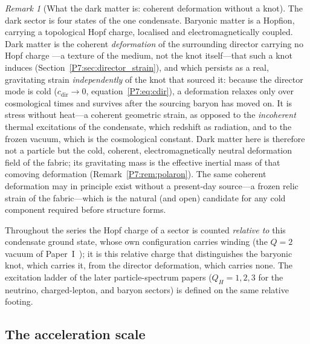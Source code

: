 \documentclass[11pt,a4paper]{article}
\theoremstyle{definition}
\theoremstyle{remark}
\newtheorem{remark}[theorem]{Remark}
\begin{document}
\begin{remark}[What the dark matter is: coherent deformation without a knot]
\label{P7:rem:cdm_ontology}
The dark sector is four states of the one condensate.  Baryonic matter
is a Hopfion, carrying a topological Hopf charge, localised and 
electromagnetically coupled.  Dark matter is the coherent
\emph{deformation} of the surrounding director carrying no Hopf charge
---a texture of the medium, not the knot itself---that such a knot induces
(Section~\ref{P7:sec:director_strain}), and which persists as a real,
gravitating strain \emph{independently} of the knot that sourced it:
because the director mode is cold ($c_{\mathrm{dir}}\to0$,
equation~\eqref{P7:eq:cdir}), a deformation relaxes only over
cosmological times and survives after the sourcing baryon has moved on.
It is stress without heat---a coherent geometric strain, as opposed to
the \emph{incoherent} thermal excitations of the condensate, which
redshift as radiation, and to the frozen vacuum, which is the
cosmological constant.  Dark matter here is therefore not a particle but
the cold, coherent, electromagnetically neutral deformation field of the
fabric; its gravitating mass is the effective inertial mass of that
comoving deformation (Remark~\ref{P7:rem:polaron}).  The same coherent
deformation may in principle exist without a present-day source---a
frozen relic strain of the fabric---which is the natural (and open)
candidate for any cold component required before structure forms.

Throughout the series the Hopf charge of a sector is counted
\emph{relative to} this condensate ground state, whose own configuration
carries winding (the $Q=2$ vacuum of Paper~I~\cite{Paper1}); it is this
relative charge that distinguishes the baryonic knot, which carries it,
from the director deformation, which carries none.  The excitation ladder
of the later particle-spectrum papers ($Q_H=1,2,3$ for the neutrino,
charged-lepton, and baryon sectors) is defined on the same relative
footing.
\end{remark}

\subsection{The acceleration scale}
\label{P7:sec:accel_scale}
\end{document}
